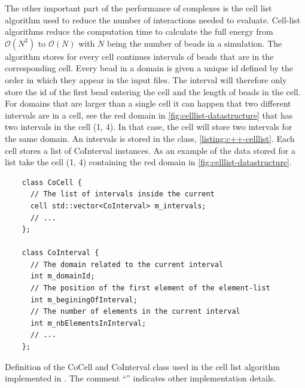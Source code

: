 \documentclass[12pt, twoside]{report}
\begin{document}
The other important part of the performance of complexes is the cell list
algorithm \cite{frenkel2001understanding} used to reduce the number of
interactions needed to evaluate. Cell-list algorithms reduce the computation
time to calculate the full energy from \(\mathcal{O}(N^2)\) to
\(\mathcal{O}(N)\) with \(N\) being the number of beads in a simulation. The
algorithm stores for every cell continues intervals of beads that are in the
corresponding cell. Every bead in a domain is given a unique id defined by the
order in which they appear in the input files. The interval will therefore only
store the id of the first bead entering the cell and the length of beads in the
cell. For domains that are larger than a single cell it can happen that two
different intervals are in a cell, see the red domain in
\cref{fig:celllist-datastructure} that has two intervals in the cell (1, 4). In
that case, the cell will store two intervals for the same domain. An intervals
is stored in the  class, \cref{listing:c++-celllist}.
Each cell stores a list of CoInterval instances. As an example of the data
stored for a list take the cell (1, 4) containing the red domain in
\cref{fig:celllist-datastructure}.
\begin{listing}[!ht]
  \begin{verbatim}
    class CoCell {
      // The list of intervals inside the current
      cell std::vector<CoInterval> m_intervals;
      // ...
    };

    class CoInterval {
      // The domain related to the current interval
      int m_domainId;
      // The position of the first element of the element-list
      int m_beginingOfInterval;
      // The number of elements in the current interval
      int m_nbElementsInInterval;
      // ...
    };
\end{verbatim}
\caption{Definition of the CoCell and CoInterval class used in the cell list
algorithm implemented in \complexes. The comment ``'' indicates
other implementation details.}
\label{listing:c++-celllist}
\end{listing}
\end{document}
